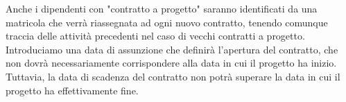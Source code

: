         Anche i dipendenti con "contratto a progetto" saranno identificati da una matricola che verrà riassegnata ad ogni nuovo contratto, tenendo comunque traccia delle attività precedenti nel caso di vecchi contratti a progetto. Introduciamo una data di assunzione che definirà l'apertura del contratto, che non dovrà necessariamente corrispondere alla data in cui il progetto ha inizio. Tuttavia, la data di scadenza del contratto non potrà superare la data in cui il progetto ha effettivamente fine.\\